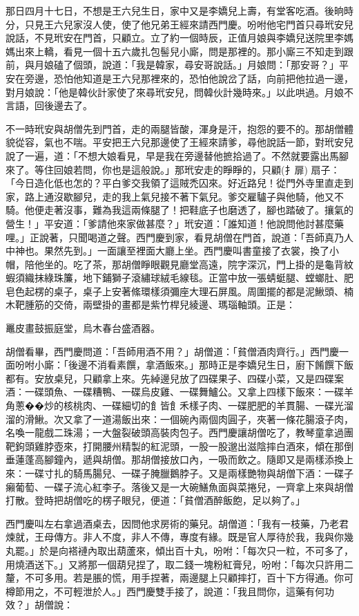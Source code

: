 \begin{showcontents}{}
那日四月十七日，不想是王六兒生日，家中又是李嬌兒上壽，有堂客吃酒。後晌時分，只見王六兒家沒人使，使了他兄弟王經來請西門慶。吩咐他宅門首只尋玳安兒說話，不見玳安在門首，只顧立。立了約一個時辰，正值月娘與李嬌兒送院里李媽媽出來上轎，看見一個十五六歲扎包髻兒小廝，問是那裡的。那小廝三不知走到跟前，與月娘磕了個頭，說道：「我是韓家，尋安哥說話。」月娘問：「那安哥？」平安在旁邊，恐怕他知道是王六兒那裡來的，恐怕他說岔了話，向前把他拉過一邊，對月娘說：「他是韓伙計家使了來尋玳安兒，問韓伙計幾時來。」以此哄過。月娘不言語，回後邊去了。

不一時玳安與胡僧先到門首，走的兩腿皆酸，渾身是汗，抱怨的要不的。那胡僧體貌從容，氣也不喘。平安把王六兒那邊使了王經來請爹，尋他說話一節，對玳安兒說了一遍，道：「不想大娘看見，早是我在旁邊替他摭拾過了。不然就要露出馬腳來了。等住回娘若問，你也是這般說。」那玳安走的睜睜的，只顧(扌扉) 扇子： 「今日造化低也怎的？平白爹交我領了這賊禿囚來。好近路兒！從門外寺里直走到家，路上通沒歇腳兒，走的我上氣兒接不著下氣兒。爹交雇驢子與他騎，他又不騎。他便走著沒事，難為我這兩條腿了！把鞋底子也磨透了，腳也踏破了。攘氣的營生！」平安道：「爹請他來家做甚麼？」玳安道：「誰知道！他說問他討甚麼藥哩。」正說著，只聞喝道之聲。西門慶到家，看見胡僧在門首，說道：「吾師真乃人中神也。果然先到。」一面讓至裡面大廳上坐。西門慶叫書童接了衣裳，換了小帽，陪他坐的。吃了茶，那胡僧睜眼觀見廳堂高遠，院字深沉，門上掛的是龜背紋蝦須織抹綠珠簾，地下鋪獅子滾繡球絨毛線毯。正當中放一張蜻蜓腿、螳螂肚、肥皂色起楞的桌子，桌子上安著絛環樣須彌座大理石屏風。周圍擺的都是泥鰍頭、楠木靶腫筋的交倚，兩壁掛的畫都是紫竹桿兒綾邊、瑪瑙軸頭。正是：

鼉皮畫鼓振庭堂，烏木春台盛酒器。

胡僧看畢，西門慶問道：「吾師用酒不用？」胡僧道：「貧僧酒肉齊行。」西門慶一面吩咐小廝：「後邊不消看素饌，拿酒飯來。」那時正是李嬌兒生日，廚下餚饌下飯都有。安放桌兒，只顧拿上來。先綽邊兒放了四碟果子、四碟小菜，又是四碟案酒：一碟頭魚、一碟糟鴨、一碟烏皮雞、一碟舞鱸公。又拿上四樣下飯來：一碟羊角蔥��炒的核桃肉、一碟細切的飠皆飠禾樣子肉、一碟肥肥的羊貫腸、一碟光溜溜的滑鰍。次又拿了一道湯飯出來：一個碗內兩個肉圓子，夾著一條花腸滾子肉，名喚一龍戲二珠湯；一大盤裂破頭高裝肉包子。西門慶讓胡僧吃了，教琴童拿過團靶鉤頭雞脖壺來，打開腰州精製的紅泥頭，一股一股邈出滋陰摔白酒來，傾在那倒垂蓮蓬高腳鐘內，遞與胡僧。那胡僧接放口內，一吸而飲之。隨即又是兩樣添換上來：一碟寸扎的騎馬腸兒、一碟子腌臘鵝脖子。又是兩樣艷物與胡僧下酒：一碟子癩葡萄、一碟子流心紅李子。落後又是一大碗鱔魚面與菜捲兒，一齊拿上來與胡僧打散。登時把胡僧吃的楞子眼兒，便道：「貧僧酒醉飯飽，足以夠了。」

西門慶叫左右拿過酒桌去，因問他求房術的藥兒。胡僧道：「我有一枝藥，乃老君煉就，王母傳方。非人不度，非人不傳，專度有緣。既是官人厚待於我，我與你幾丸罷。」於是向褡褳內取出葫蘆來，傾出百十丸，吩咐：「每次只一粒，不可多了，用燒酒送下。」又將那一個葫兒捏了，取二錢一塊粉紅膏兒，吩咐：「每次只許用二釐，不可多用。若是脹的慌，用手捏著，兩邊腿上只顧摔打，百十下方得通。你可樽節用之，不可輕泄於人。」西門慶雙手接了，說道：「我且問你，這藥有何功效？」胡僧說：


\end{showcontents}
